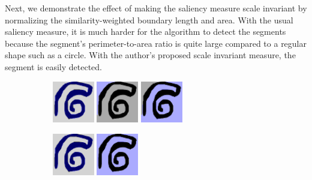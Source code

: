 \documentclass[12pt]{article}%
\begin{document}
Next, we demonstrate the effect of making the saliency measure scale invariant by normalizing the similarity-weighted boundary length and area. With the usual saliency measure, it is much harder for the algorithm to detect the segments because the segment's perimeter-to-area ratio is quite large compared to a regular shape such as a circle. With the author's proposed scale invariant measure, the segment is easily detected.\\

\begin{figure}[ht]

\begin{subfigure}[b]{\textwidth}
\centering
\includegraphics[width=0.2\textwidth,height=0.2\textwidth]{spiral_bad_seg_1.png} \hspace{.45cm}
\includegraphics[width=0.2\textwidth,height=0.2\textwidth]{spiral_bad_seg_2.png} \hspace{.45cm}
\includegraphics[width=0.2\textwidth,height=0.2\textwidth]{spiral_bad_seg_3.png}
\end{subfigure}

\vspace{.45cm}

\begin{subfigure}[b]{\textwidth}
\centering
\includegraphics[width=0.2\textwidth,height=0.2\textwidth]{spiral_good_seg_1.png} \hspace{.45cm}
\includegraphics[width=0.2\textwidth,height=0.2\textwidth]{spiral_good_seg_2.png}
\end{subfigure}


\end{figure}
\end{document}
